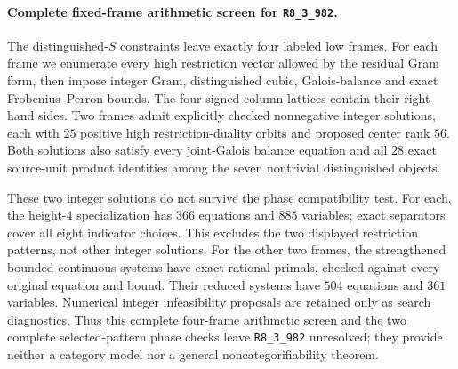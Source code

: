 \paragraph{Complete fixed-frame arithmetic screen for \texttt{R8\_3\_982}.}
The distinguished-$S$ constraints leave exactly four labeled low frames.
For each frame we enumerate every high restriction vector allowed by the
residual Gram form, then impose integer Gram, distinguished cubic,
Galois-balance and exact Frobenius--Perron bounds.  The four signed column
lattices contain their right-hand sides.  Two frames admit explicitly
checked nonnegative integer solutions, each with $25$ positive high
restriction-duality orbits and proposed center rank $56$.  Both solutions
also satisfy every joint-Galois balance equation and all $28$ exact
source-unit product identities among the seven nontrivial distinguished
objects.

These two integer solutions do not survive the phase compatibility test.
For each, the height-$4$ specialization has $366$ equations and $885$
variables; exact separators cover all eight indicator choices.  This
excludes the two displayed restriction patterns, not other integer
solutions.  For the other two frames, the strengthened bounded continuous
systems have exact rational primals, checked against every original
equation and bound.  Their reduced systems have $504$ equations and $361$
variables.  Numerical integer infeasibility proposals are retained only
as search diagnostics.  Thus this complete four-frame arithmetic screen
and the two complete selected-pattern phase checks leave
\texttt{R8\_3\_982} unresolved; they provide neither a category model nor
a general noncategorifiability theorem.
